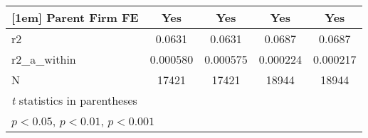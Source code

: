 {\begin{tabular}{l*{4}{c}}
[1em]
Parent Firm FE&         Yes         &         Yes         &         Yes         &         Yes         \\
\hline
r2          &      0.0631         &      0.0631         &      0.0687         &      0.0687         \\
r2\_a\_within &    0.000580         &    0.000575         &    0.000224         &    0.000217         \\
N           &       17421         &       17421         &       18944         &       18944         \\
\hline\hline
\multicolumn{5}{l}{\footnotesize \textit{t} statistics in parentheses}\\
\multicolumn{5}{l}{\footnotesize \sym{*} \(p<0.05\), \sym{**} \(p<0.01\), \sym{***} \(p<0.001\)}\\
\end{tabular}
}
